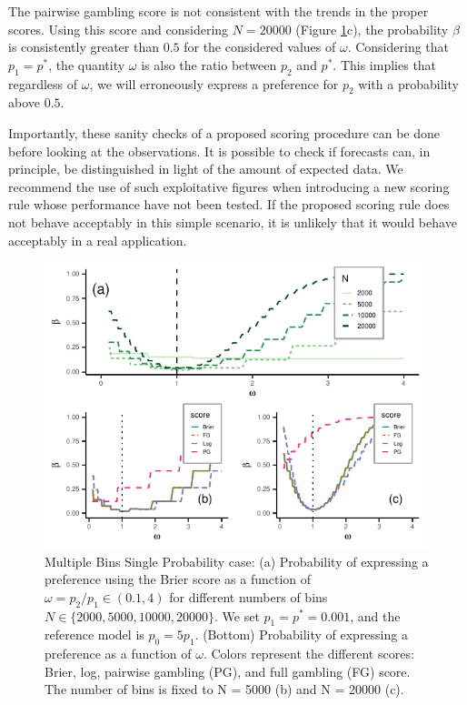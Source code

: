\documentclass[referee,sn-basic]{sn-jnl}
\theoremstyle{thmstyleone}%
\theoremstyle{thmstyletwo}%
\theoremstyle{thmstylethree}%
\begin{document}
The pairwise gambling score is not consistent with the trends in the proper scores. Using this score and considering $N = 20000$ (Figure \ref{fig:8}c), the probability $\beta$ is consistently greater than $0.5$ for the considered values of $\omega$. Considering that $p_1 = p^*$, the quantity $\omega$ is also the ratio between $p_2$ and $p^*$. This implies that regardless of $\omega$, we will erroneously express a preference for $p_2$ with a probability above $0.5$.  

Importantly, these sanity checks of a proposed scoring procedure can be done before looking at the observations. It is possible to check if forecasts can, in principle, be distinguished in light of the amount of expected data. We recommend the use of such exploitative figures when introducing a new scoring rule whose performance have not been tested. If the proposed scoring rule does not behave acceptably in this simple scenario, it is unlikely that it would behave acceptably in a real application.

\begin{figure}
  \includegraphics[width = 0.99\textwidth]{figure8.pdf}
\caption{Multiple Bins Single Probability case: (a) Probability of expressing a preference using the Brier score as a function of $\omega = p_2/p_1 \in (0.1,4)$  for different numbers of bins $N \in \{2000,5000,10000,20000\}$. We set $p_1 = p^* = 0.001$, and the reference model is $p_0 = 5p_1$. (Bottom) Probability of expressing a preference as a function of $\omega$. Colors represent the different scores: Brier, log, pairwise gambling (PG), and full gambling (FG) score. The number of bins is fixed to N = 5000 (b) and N = 20000 (c).}
\label{fig:8}
\end{figure}
\end{document}
